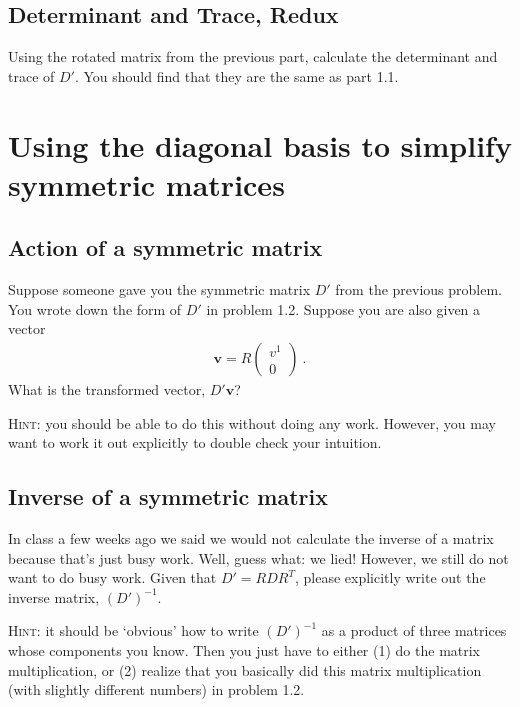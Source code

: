 \documentclass[12pt]{article}
\numberwithin{equation}{section}    %
\renewcommand{\vec}[1]{\mathbf{#1}} %
\begin{document}
\subsection{Determinant and Trace, Redux}

Using the rotated matrix from the previous part, calculate the determinant and trace of $D'$. You should find that they are the same as part 1.1. 

\section{Using the diagonal basis to simplify symmetric matrices}

\subsection{Action of a symmetric matrix}

Suppose someone gave you the symmetric matrix $D'$ from the previous problem. You wrote down the form of $D'$ in problem 1.2. Suppose you are also given a vector
\begin{align}
	\vec{v} = R 
	\begin{pmatrix}
	v^1 \\ 0	
	\end{pmatrix} \ .
\end{align}
What is the transformed vector, $D'\vec{v}$? 

\textsc{Hint:} you should be able to do this without doing any work. However, you may want to work it out explicitly to double check your intuition.



\subsection{Inverse of a symmetric matrix}

In class a few weeks ago we said we would not calculate the inverse of a matrix because that's just busy work. Well, guess what: we lied! However, we still do not want to do busy work. Given that $D' = R D R^T$, please explicitly write out the inverse matrix, $(D')^{-1}$. 

\textsc{Hint:} it should be `obvious' how to write $(D')^{-1}$ as a product of three matrices whose components you know. Then you just have to either (1) do the matrix multiplication, or (2) realize that you basically did this matrix multiplication (with slightly different numbers) in problem 1.2.



\end{document}
